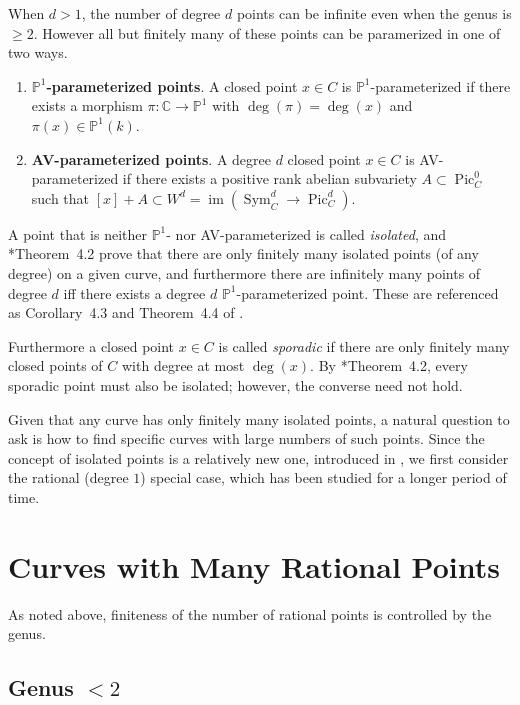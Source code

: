 \documentclass[12pt, reqno]{amsart}
\newcommand{\PP}{{\mathbb P}}
\newcommand{\C}{{\mathbb C}}
\DeclareMathOperator{\im}{im}
\DeclareMathOperator{\Sym}{Sym}
\DeclareMathOperator{\Pic}{Pic}
\numberwithin{equation}{section}
\numberwithin{table}{section}
\begin{document}
When $d > 1$, the number of degree $d$ points can be infinite even
when the genus is $\ge 2$. However all but finitely many of these
points can be paramerized in one of two ways.
\begin{enumerate}
  \item \textbf{$\PP^1$-parameterized points}. A closed point $x \in
    C$ is $\PP^1$-parameterized if there exists a morphism $\pi : \C \to \PP^1$ with
    $\deg(\pi) = \deg(x)$ and $\pi(x) \in \PP^1(k)$.

  \item \textbf{AV-parameterized points}. A degree $d$ closed point $x
    \in C$ is AV-parameterized if there exists a positive rank abelian
    subvariety $A \subset \Pic^0_C$ such that $[x] + A \subset W^d =
    \im(\Sym^d_C \to \Pic^d_C)$.
\end{enumerate}

A point that is neither $\PP^1$- nor AV-parameterized is called
\textit{isolated}, and \cite{Bourdon2019}*{Theorem~4.2} prove that
there are only finitely many isolated points (of any degree) on a
given curve, and furthermore there are infinitely many points of
degree $d$ iff there exists a degree $d$ $\PP^1$-parameterized point.
These are referenced as Corollary~4.3 and Theorem~4.4 of
\cite{Viray2024}.

Furthermore a closed point $x \in C$ is called \textit{sporadic} if
there are only finitely many closed points of $C$ with degree at most
$\deg(x)$. By \cite{Bourdon2019}*{Theorem~4.2}, every sporadic point
must also be isolated; however, the converse need not hold.

Given that any curve has only finitely many isolated points, a natural
question to ask is how to find specific curves with large numbers of
such points. Since the concept of isolated points is a relatively new
one, introduced in \cite{Bourdon2019}, we first consider the rational
(degree $1$) special case, which has been studied for a longer period
of time.


\section{Curves with Many Rational Points}

As noted above, finiteness of the number of rational points is controlled by the genus.

\subsection{Genus \texorpdfstring{$< 2$}{< 2}}
\end{document}
